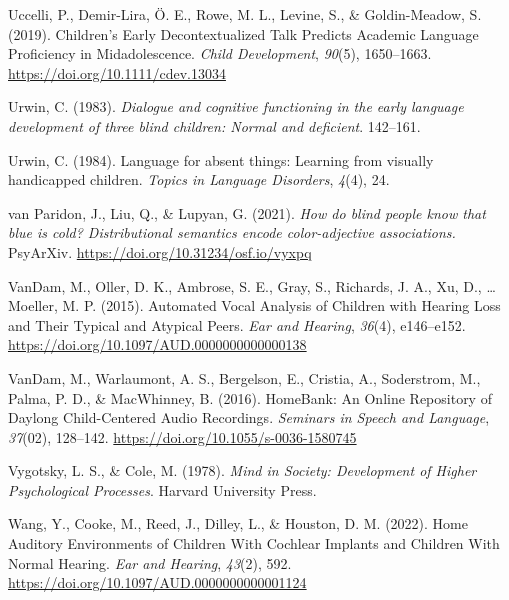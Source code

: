 \documentclass[
  man]{apa6}
\newlength{\cslhangindent}
\newlength{\cslentryspacingunit} %
\newenvironment{CSLReferences}[2] %
 {%
  \setlength{\parindent}{0pt}
  \ifodd #1
  \let\oldpar\par
  \def\par{\hangindent=\cslhangindent\oldpar}
  \fi
  \setlength{\parskip}{#2\cslentryspacingunit}
 }%
 {}
\begin{document}
\begin{CSLReferences}{1}{0}
\leavevmode{}%
Uccelli, P., Demir-Lira, Ö. E., Rowe, M. L., Levine, S., \& Goldin-Meadow, S. (2019). Children's {Early Decontextualized Talk Predicts Academic Language Proficiency} in {Midadolescence}. \emph{Child Development}, \emph{90}(5), 1650--1663. \url{https://doi.org/10.1111/cdev.13034}

\leavevmode{}%
Urwin, C. (1983). \emph{Dialogue and cognitive functioning in the early language development of three blind children: {Normal} and deficient}. 142--161.

\leavevmode{}%
Urwin, C. (1984). Language for absent things: Learning from visually handicapped children. \emph{Topics in Language Disorders}, \emph{4}(4), 24.

\leavevmode{}%
van Paridon, J., Liu, Q., \& Lupyan, G. (2021). \emph{How do blind people know that blue is cold? {Distributional} semantics encode color-adjective associations.} PsyArXiv. \url{https://doi.org/10.31234/osf.io/vyxpq}

\leavevmode{}%
VanDam, M., Oller, D. K., Ambrose, S. E., Gray, S., Richards, J. A., Xu, D., \ldots{} Moeller, M. P. (2015). Automated {Vocal Analysis} of {Children} with {Hearing Loss} and {Their Typical} and {Atypical Peers}. \emph{Ear and Hearing}, \emph{36}(4), e146--e152. \url{https://doi.org/10.1097/AUD.0000000000000138}

\leavevmode{}%
VanDam, M., Warlaumont, A. S., Bergelson, E., Cristia, A., Soderstrom, M., Palma, P. D., \& MacWhinney, B. (2016). {HomeBank}: {An Online Repository} of {Daylong Child-Centered Audio Recordings}. \emph{Seminars in Speech and Language}, \emph{37}(02), 128--142. \url{https://doi.org/10.1055/s-0036-1580745}

\leavevmode{}%
Vygotsky, L. S., \& Cole, M. (1978). \emph{Mind in {Society}: {Development} of {Higher Psychological Processes}}. Harvard University Press.

\leavevmode{}%
Wang, Y., Cooke, M., Reed, J., Dilley, L., \& Houston, D. M. (2022). Home {Auditory Environments} of {Children With Cochlear Implants} and {Children With Normal Hearing}. \emph{Ear and Hearing}, \emph{43}(2), 592. \url{https://doi.org/10.1097/AUD.0000000000001124}


\end{CSLReferences}
\end{document}
